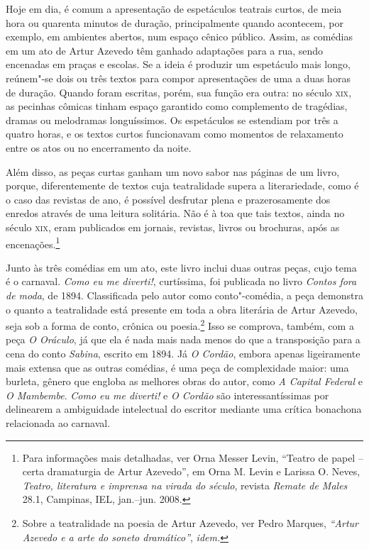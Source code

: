 Hoje em dia, é comum a apresentação de espetáculos teatrais curtos, de
meia hora ou quarenta minutos de duração, principalmente quando acontecem, por exemplo, em ambientes abertos, num espaço cênico
público. Assim, as comédias em um ato de Artur Azevedo têm ganhado
adaptações para a rua, sendo encenadas em praças e escolas. Se a ideia é
produzir um espetáculo mais longo, reúnem"-se dois ou três textos para
compor apresentações de uma a duas horas de duração. Quando foram
escritas, porém, sua função era outra: no século \textsc{xix}, as pecinhas
cômicas tinham espaço garantido como complemento de tragédias, dramas
ou melodramas longuíssimos. Os espetáculos se estendiam por três a
quatro horas, e os textos curtos funcionavam como momentos de
relaxamento entre os atos ou no encerramento da noite. 

Além disso, as peças curtas ganham um novo sabor nas páginas de um
livro, porque, diferentemente de textos cuja teatralidade supera a
literariedade, como é o caso das revistas de ano, é possível desfrutar
plena e prazerosamente dos enredos através de uma leitura solitária.
Não é à toa que tais textos, ainda no século \textsc{xix}, eram publicados em
jornais, revistas, livros ou brochuras, após as encenações.\footnote{
Para informações mais detalhadas, ver Orna Messer Levin, “Teatro de papel – certa dramaturgia de Artur Azevedo”, em Orna M. Levin e Larissa O. Neves, \textit{Teatro,
literatura e imprensa na virada do século}, revista \textit{Remate de
Males }28.1, Campinas, IEL, jan.--jun.
2008.}

Junto às três comédias em um ato, este livro inclui duas outras peças,
cujo tema é o carnaval. \textit{Como eu me diverti!}, curtíssima, foi
publicada no livro \textit{Contos fora de moda}, de 1894. Classificada
pelo autor como conto"-comédia, a peça demonstra o quanto a teatralidade
está presente em toda a obra literária de Artur Azevedo, seja sob a
forma de conto, crônica ou poesia.\footnote{ Sobre a teatralidade na
poesia de Artur Azevedo, ver Pedro Marques, \textit{``Artur
Azevedo e a arte do soneto dramático''}, \textit{idem.}} Isso se comprova,
também, com a peça \textit{O Oráculo}, já que ela é nada mais nada
menos do que a transposição para a cena do conto \textit{Sabina},
escrito em 1894. Já \textit{O Cordão}, embora apenas ligeiramente mais
extensa que as outras comédias, é uma peça de complexidade maior: uma
burleta, gênero que engloba as melhores obras do autor, como \textit{A
Capital Federal} e \textit{O Mambembe}. \textit{Como eu me diverti!} e
\textit{O Cordão} são interessantíssimas por delinearem a ambiguidade
intelectual do escritor mediante uma crítica bonachona relacionada ao
carnaval. 


